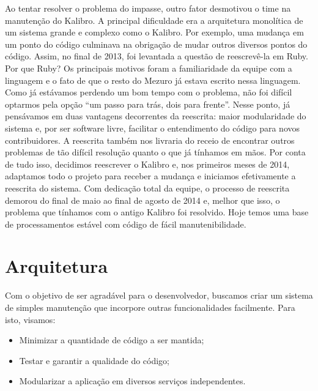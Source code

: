 \documentclass{llncs}
\begin{document}
  Ao tentar resolver o problema do impasse, outro fator desmotivou o time na manutenção do Kalibro. A principal dificuldade era a arquitetura monolítica de um sistema grande e complexo como o Kalibro. Por exemplo, uma mudança em um ponto do código culminava na obrigação de mudar outros diversos pontos do código. Assim, no final de 2013, foi levantada a questão de reescrevê-la em Ruby. Por que Ruby? Os principais motivos foram a familiaridade da equipe com a linguagem e o fato de que o resto do Mezuro já estava escrito nessa linguagem.
  Como já estávamos perdendo um bom tempo com o problema, não foi difícil optarmos pela opção ``um passo para trás, dois para frente''. Nesse ponto, já pensávamos em duas vantagens decorrentes da reescrita: maior modularidade do sistema e, por ser software livre, facilitar o entendimento do código para novos contribuidores. A reescrita também nos livraria do receio de encontrar outros problemas de tão difícil resolução quanto o que já tínhamos em mãos. Por conta de tudo isso, decidimos reescrever o Kalibro e, nos primeiros meses de 2014, adaptamos todo o projeto para receber a mudança e iniciamos efetivamente a reescrita do sistema.
  Com dedicação total da equipe, o processo de reescrita demorou do final de maio ao final de agosto de 2014 e, melhor que isso, o problema que tínhamos com o antigo Kalibro foi resolvido. Hoje temos uma base de processamentos estável com código de fácil manutenibilidade.

\section{Arquitetura}
Com o objetivo de ser agradável para o desenvolvedor, buscamos criar um sistema de simples manutenção que incorpore outras funcionalidades facilmente. Para isto, visamos:
\begin{itemize}
  \item Minimizar a quantidade de código a ser mantida;
  \item Testar e garantir a qualidade do código;
  \item Modularizar a aplicação em diversos serviços independentes.
\end{itemize}
\end{document}
